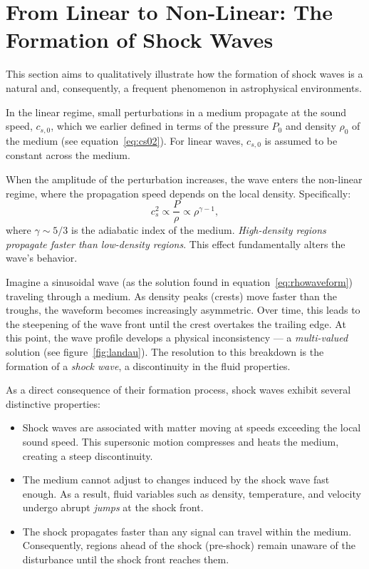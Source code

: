 \section{From Linear to Non-Linear: The Formation of Shock Waves}

This section aims to qualitatively illustrate how the formation of shock waves is a natural and, consequently, a frequent phenomenon in astrophysical environments.

In the linear regime, small perturbations in a medium propagate at the sound speed, \( c_{s,0} \), which we earlier defined in terms of the pressure \( P_0 \) and density \( \rho_0 \) of the medium (see equation~\ref{eq:cs02}). For linear waves, \( c_{s,0} \) is assumed to be constant across the medium. 

When the amplitude of the perturbation increases, the wave enters the non-linear regime, where the propagation speed depends on the local density. Specifically:  
\[
c_s^2 \propto \frac{P}{\rho} \propto \rho^{\gamma - 1},
\]  
where \( \gamma \sim 5/3 \) is the adiabatic index of the medium. \emph{High-density regions propagate faster than low-density regions}. 
%
This effect fundamentally alters the wave's behavior.  

Imagine a sinusoidal wave (as the solution found in equation~\ref{eq:rhowaveform}) traveling through a medium. As density peaks (crests) move faster than the troughs, the waveform becomes increasingly asymmetric. Over time, this leads to the steepening of the wave front until the crest overtakes the trailing edge. At this point, the wave profile develops a physical inconsistency --- a \emph{multi-valued} solution (see figure~\ref{fig:landau}). The resolution to this breakdown is the formation of a \emph{shock wave}, a discontinuity in the fluid properties.

As a direct consequence of their formation process, shock waves exhibit several distinctive properties:
%
\begin{itemize}
\item Shock waves are associated with matter moving at speeds exceeding the local sound speed. This supersonic motion compresses and heats the medium, creating a steep discontinuity.  
\item The medium cannot adjust to changes induced by the shock wave fast enough. As a result, fluid variables such as density, temperature, and velocity undergo abrupt \emph{jumps} at the shock front.  
\item The shock propagates faster than any signal can travel within the medium. Consequently, regions ahead of the shock (pre-shock) remain unaware of the disturbance until the shock front reaches them.  
\end{itemize}


